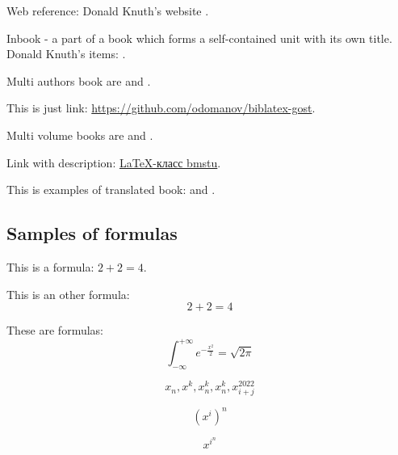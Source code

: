 Web reference: Donald Knuth's website \parencite{example-online}.

Inbook - a part of a book which forms a self-contained unit with its own title. Donald Knuth's items: \cite{example-inbook}.

Multi authors book are \parencite{stern2020:za-novimi} and \parencite{vinogradov1954:logika}.

This is just link: \url{https://github.com/odomanov/biblatex-gost}.

Multi volume books are \parencite{schopenhauer:soch} and \parencite{kondrashevsky2010:practichesky}.

Link with description: \href{https://github.com/Orianti/bmstu-latex-class/blob/master/bmstu/examples/bmstu-examples.tex}{LaTeX-класс bmstu}.

This is examples of translated book: \parencite{dante1988:bozh} and \parencite{grzegorczyk1979:logika}.

\subsection{Samples of formulas}
This is a formula: $2 + 2 = 4$.

This is an other formula:
\[2 + 2 = 4\]

These are formulas:
\[\int_{-\infty}^{+\infty} e^{-\frac{x^2}{2}} = \sqrt{2 \pi}\]

\[x_n, x^k, x_n^k, x^k_n, x_{i + j}^{2022}\]

\[(x^i)^n\]

\[x^{i^n}\]
